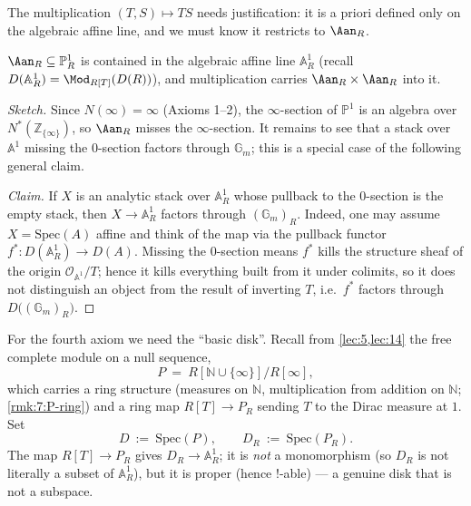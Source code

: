 The multiplication $(T,S)\mapsto TS$ needs justification: it is a priori defined
only on the algebraic affine line, and we must know it restricts to $\Aan_R$.

\begin{lemma}
\label{lem:20:mult-well-defined}
$\Aan_R\subseteq\mathbb P^1_R$ is contained in the algebraic affine line
$\mathbb A^1_R$ (recall $D(\mathbb A^1_R)=\Mod_{R[T]}(D(R))$), and multiplication
carries $\Aan_R\times\Aan_R$ into it.
\end{lemma}

\begin{proof}[Sketch]
Since $N(\infty)=\infty$ (Axioms 1--2), the $\infty$-section of $\mathbb P^1$ is
an algebra over $N^*(\mathbb Z_{\{\infty\}})$, so $\Aan_R$ misses the
$\infty$-section. It remains to see that a stack over $\mathbb A^1$ missing the
$0$-section factors through $\mathbb G_m$; this is a special case of the
following general claim.

\emph{Claim.} If $X$ is an analytic stack over $\mathbb A^1_R$ whose pullback to
the $0$-section is the empty stack, then $X\to\mathbb A^1_R$ factors through
$(\mathbb G_m)_R$. Indeed, one may assume $X=\mathrm{Spec}(A)$ affine and think of
the map via the pullback functor $f^*\colon D(\mathbb A^1_R)\to D(A)$. Missing
the $0$-section means $f^*$ kills the structure sheaf of the origin
$\mathcal O_{\mathbb A^1}/T$; hence it kills everything built from it under
colimits, so it does not distinguish an object from the result of inverting $T$,
i.e.\ $f^*$ factors through $D\bigl((\mathbb G_m)_R\bigr)$. \qedhere
\end{proof}

For the fourth axiom we need the ``basic disk''. Recall from
\cref{lec:5,lec:14} the free complete module on a null sequence,
\begin{equation*}
P\ =\ R[\mathbb N\cup\{\infty\}]/R[\infty],
\end{equation*}
which carries a ring structure (measures on $\mathbb N$, multiplication from
addition on $\mathbb N$; \cref{rmk:7:P-ring}) and a ring map $R[T]\to P_R$
sending $T$ to the Dirac measure at $1$. Set
\begin{equation*}
D\ :=\ \mathrm{Spec}(P),\qquad D_R\ :=\ \mathrm{Spec}(P_R).
\end{equation*}
The map $R[T]\to P_R$ gives $D_R\to\mathbb A^1_R$; it is \emph{not} a
monomorphism (so $D_R$ is not literally a subset of $\mathbb A^1_R$), but it is
proper (hence $!$-able) --- a genuine disk that is not a subspace.

